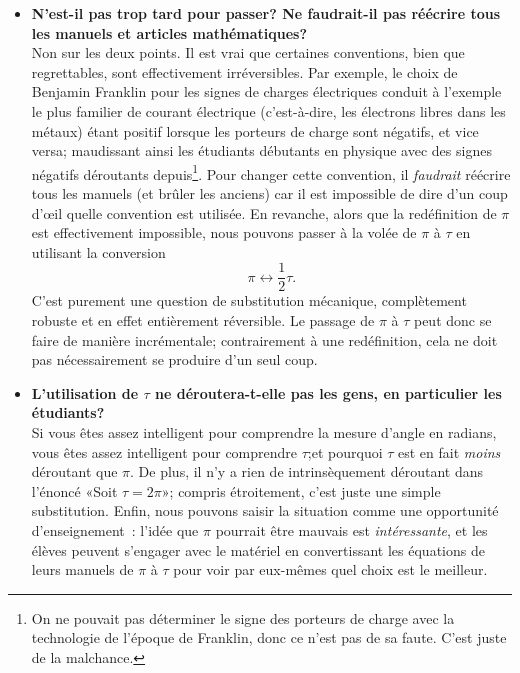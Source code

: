 \begin{itemize}
  \item \textbf{N'est-il pas trop tard pour passer\ns? Ne faudrait-il pas
  réécrire tous les manuels et articles mathématiques\ns?} \\ Non sur les deux
  points. Il est vrai que certaines conventions, bien que regrettables, sont
  effectivement irréversibles. Par exemple, le choix de Benjamin Franklin pour
  les signes de charges électriques conduit à l'exemple le plus familier de
  courant électrique (c'est-à-dire, les électrons libres dans les métaux) étant
  positif lorsque les porteurs de charge sont négatifs, et vice
  versa\ns; maudissant ainsi les étudiants débutants en physique avec des signes
  négatifs déroutants depuis\ns\footnote{On ne pouvait pas déterminer le signe
  des porteurs de charge avec la technologie de l'époque de Franklin, donc ce
  n'est pas de sa faute. C'est juste de la malchance.}. Pour changer cette
  convention, il \emph{faudrait} réécrire tous les manuels (et brûler les
  anciens) car il est impossible de dire d'un coup d'œil quelle convention est
  utilisée. En revanche, alors que la redéfinition de $\pi$ est effectivement
  impossible, nous pouvons passer à la volée de $\pi$ à $\tau$ en utilisant la
  conversion \[ \pi \leftrightarrow \textstyle{\frac{1}{2}}\tau. \] C'est
  purement une question de substitution mécanique, complètement robuste et en
  effet entièrement réversible. Le passage de $\pi$ à $\tau$ peut donc se faire
  de manière incrémentale\ns; contrairement à une redéfinition, cela ne doit pas
  nécessairement se produire d'un seul coup.

  \item \textbf{L'utilisation de $\tau$ ne déroutera-t-elle pas les gens, en
  particulier les étudiants\ns?} \\ Si vous êtes assez intelligent pour
  comprendre la mesure d'angle en radians, vous êtes assez intelligent pour
  comprendre $\tau$\ns;et pourquoi $\tau$ est en fait \emph{moins} déroutant que
  $\pi$. De plus, il n'y a rien de intrinsèquement déroutant dans l'énoncé
  «\ns Soit $\tau=2\pi$\ns »\ns; compris étroitement, c'est juste une simple
  substitution. Enfin, nous pouvons saisir la situation comme une opportunité
  d'enseignement~: l'idée que $\pi$ pourrait être mauvais est
  \emph{intéressante}, et les élèves peuvent s'engager avec le matériel en
  convertissant les équations de leurs manuels de $\pi$ à $\tau$ pour voir par
  eux-mêmes quel choix est le meilleur.


\end{itemize}
